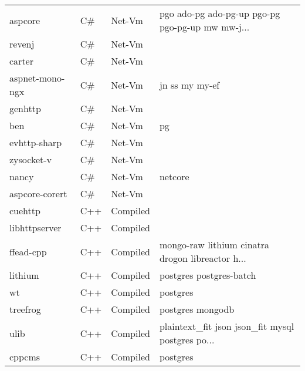 \begin{longtable}{llll}
    aspcore          & C\#         & Net-Vm      & pgo ado-pg ado-pg-up pgo-pg pgo-pg-up mw mw-j...   \\
    revenj           & C\#         & Net-Vm      &                                                    \\
    carter           & C\#         & Net-Vm      &                                                    \\
    aspnet-mono-ngx  & C\#         & Net-Vm      & jn ss my my-ef                                     \\
    genhttp          & C\#         & Net-Vm      &                                                    \\
    ben              & C\#         & Net-Vm      & pg                                                 \\
    evhttp-sharp     & C\#         & Net-Vm      &                                                    \\
    zysocket-v       & C\#         & Net-Vm      &                                                    \\
    nancy            & C\#         & Net-Vm      & netcore                                            \\
    aspcore-corert   & C\#         & Net-Vm      &                                                    \\
    cuehttp          & C++         & Compiled    &                                                    \\
    libhttpserver    & C++         & Compiled    &                                                    \\
    ffead-cpp        & C++         & Compiled    & mongo-raw lithium cinatra drogon libreactor h...   \\
    lithium          & C++         & Compiled    & postgres postgres-batch                            \\
    wt               & C++         & Compiled    & postgres                                           \\
    treefrog         & C++         & Compiled    & postgres mongodb                                   \\
    ulib             & C++         & Compiled    & plaintext\_fit json json\_fit mysql postgres po... \\
    cppcms           & C++         & Compiled    & postgres                                           \\

\end{longtable}
